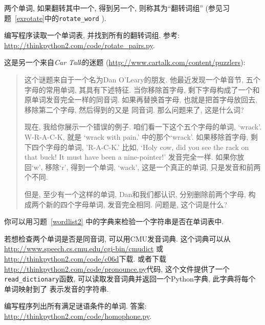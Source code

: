 \documentclass[10pt]{book}
\begin{document}
\begin{exercise}
\label{exrotatepairs}

两个单词, 如果翻转其中一个, 得到另一个, 则称其为``翻转词组''
(参见习题~\ref{exrotate}中的\verb"rotate_word" ).

编写程序读取一个单词表, 并找到所有的翻转词组. 
参考: \url{http://thinkpython2.com/code/rotate_pairs.py}.

\end{exercise}


\begin{exercise}

这是另一个来自{\em Car Talk}的迷题
(\url{http://www.cartalk.com/content/puzzlers}):

\begin{quote}
这个谜题来自于一个名为Dan O'Leary的朋友. 
他最近发现一个单音节, 五个字母的常用单词, 其具有下述特征. 
当你移除首字母, 剩下字母构成了一个和原单词发音完全一样的同音词. 
如果再替换首字母, 也就是把首字母放回去, 移除第二个字母, 然后得到的又是
同音词. 那么问题来了, 这是什么词?

现在, 我给你展示一个错误的例子. 
咱们看一下这个五个字母的单词, `wrack'.  W-R-A-C-K, 就是
`wrack with pain.' 中的那个`wrack'. 
如果移除首字母, 剩下四个字母的单词, 'R-A-C-K.' 
比如, `Holy cow, did you see the rack on that buck!
It must have been a nine-pointer!' 发音完全一样. 
如果你放回`w', 移除`r', 得到一个单词, `wack', 
这是一个真正的单词, 只是发音和前两个不同. 

但是, 至少有一个这样的单词, Dan和我们都认识, 
分别删除前两个字母, 构成两个新的四个字母单词, 发音完全相同. 
问题是, 这个词是什么?
\end{quote}

你可以用习题~\ref{wordlist2} 中的字典来检验一个字符串是否在单词表中. 

若想检查两个单词是否是同音词, 可以用CMU发音词典. 
这个词典可以从\url{http://www.speech.cs.cmu.edu/cgi-bin/cmudict}
或\url{http://thinkpython2.com/code/c06d}下载. 
或者下载\url{http://thinkpython2.com/code/pronounce.py}代码, 
这个文件提供了一个 \verb"read_dictionary"函数, 
可以读取发音词典并返回一个Python字典, 此字典将每个单词映射到了
表示发音的字符串. 

编写程序列出所有满足谜语条件的单词. 
答案: \url{http://thinkpython2.com/code/homophone.py}.

\end{exercise}
\end{document}
